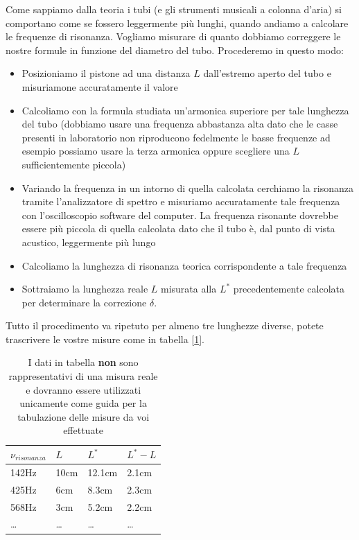 \documentclass[a4paper,10pt,oneside]{article}
\begin{document}
Come sappiamo dalla teoria i tubi (e gli strumenti musicali a colonna d'aria) si comportano come se fossero leggermente più lunghi, quando andiamo a calcolare le frequenze di risonanza. Vogliamo misurare di quanto dobbiamo correggere le nostre formule in funzione del diametro del tubo. Procederemo in questo modo:
\begin{itemize}
 \item Posizioniamo il pistone ad una distanza $L$ dall'estremo aperto del tubo e misuriamone accuratamente il valore
 \item Calcoliamo con la formula studiata un'armonica superiore per tale lunghezza del tubo (dobbiamo usare una frequenza abbastanza alta dato che le casse presenti in laboratorio non riproducono fedelmente le basse frequenze ad esempio possiamo usare la terza armonica oppure scegliere una $L$ sufficientemente piccola)
 \item Variando la frequenza in un intorno di quella calcolata cerchiamo la risonanza tramite l'analizzatore di spettro  e misuriamo accuratamente tale frequenza con l'oscilloscopio software del computer. La frequenza risonante dovrebbe essere più piccola di quella calcolata dato che il tubo è, dal punto di vista acustico, leggermente più lungo
\item Calcoliamo la lunghezza di risonanza teorica corrispondente a tale frequenza
\item Sottraiamo la lunghezza reale $L$ misurata alla $L^*$ precedentemente calcolata per determinare la correzione $\delta$.
\end{itemize}
Tutto il procedimento va ripetuto per almeno tre lunghezze diverse, potete trascrivere le vostre misure come in tabella  [\ref{tab:correzione}].

\begin{table}[H]
\begin{center}
\begin{tabular}{llll}\toprule
$\nu_{risonanza}$ &$L$&$L^*$&$L^*-L$\\ \midrule
142Hz & 10cm &12.1cm&2.1cm\\
425Hz & 6cm  &8.3cm&2.3cm\\
568Hz & 3cm  &5.2cm&2.2cm\\
\ldots &\ldots&\ldots&\ldots \\ \bottomrule
\end{tabular}\caption{I dati in tabella \textbf{non} sono rappresentativi di una misura reale e dovranno essere utilizzati unicamente come guida per la tabulazione delle misure da voi effettuate}\label{tab:correzione}
\end{center}
\end{table}
\end{document}
